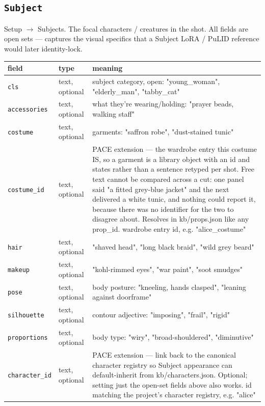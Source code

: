 \subsection*{\texttt{Subject}}
\noindent Setup $\to$ Subjects. The focal characters /\allowbreak{} creatures in the shot. All fields are open sets ---\allowbreak{} captures the visual specifics that a Subject LoRA /\allowbreak{} PuLID reference would later identity-lock.

\begin{longtable}{@{}R{0.24\textwidth}R{0.21\textwidth}R{0.49\textwidth}@{}}
\toprule \textbf{field} & \textbf{type} & \textbf{meaning} \\ \midrule
\endhead
\texttt{cls} & text, optional & subject category, open: "young\_\allowbreak woman", "elderly\_\allowbreak man", "tabby\_\allowbreak cat" \\
\texttt{accessories} & text, optional & what they're wearing/\allowbreak{}holding: "prayer beads, walking staff" \\
\texttt{costume} & text, optional & garments: "saffron robe", "dust-stained tunic" \\
\texttt{costume\_\allowbreak id} & text, optional & PACE extension ---\allowbreak{} the wardrobe entry this costume IS, so a garment is a library object with an id and states rather than a sentence retyped per shot. Free text cannot be compared across a cut: one panel said "a fitted grey-blue jacket" and the next delivered a white tunic, and nothing could report it, because there was no identifier for the two to disagree about. Resolves in kb/\allowbreak{}props.json like any prop\_\allowbreak id. wardrobe entry id, e.g. "alice\_\allowbreak costume" \\
\texttt{hair} & text, optional & "shaved head", "long black braid", "wild grey beard" \\
\texttt{makeup} & text, optional & "kohl-rimmed eyes", "war paint", "soot smudges" \\
\texttt{pose} & text, optional & body posture: "kneeling, hands clasped", "leaning against doorframe" \\
\texttt{silhouette} & text, optional & contour adjective: "imposing", "frail", "rigid" \\
\texttt{proportions} & text, optional & body type: "wiry", "broad-shouldered", "diminutive" \\
\texttt{character\_\allowbreak id} & text, optional & PACE extension ---\allowbreak{} link back to the canonical character registry so Subject appearance can default-inherit from kb/\allowbreak{}characters.json. Optional; setting just the open-set fields above also works. id matching the project's character registry, e.g. "alice" \\

\end{longtable}
